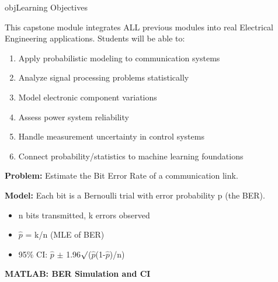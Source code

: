 \begin{PSbox}[unbreakable]{obj}{Learning Objectives}

This capstone module integrates ALL previous modules into real Electrical Engineering applications. Students will be able to:

\begin{enumerate}
\def\labelenumi{\arabic{enumi}.}
\tightlist
\item
  Apply probabilistic modeling to communication systems
\item
  Analyze signal processing problems statistically
\item
  Model electronic component variations
\item
  Assess power system reliability
\item
  Handle measurement uncertainty in control systems
\item
  Connect probability/statistics to machine learning foundations
\end{enumerate}

\end{PSbox}



\textbf{Problem:} Estimate the Bit Error Rate of a communication link.

\textbf{Model:} Each bit is a Bernoulli trial with error probability p (the BER).

\begin{itemize}
\tightlist
\item
  n bits transmitted, k errors observed
\item
  \ensuremath{\hat{p}} = k/n (MLE of BER)
\item
  95\% CI: \ensuremath{\hat{p}} \ensuremath{\pm} 1.96\ensuremath{\surd}(\ensuremath{\hat{p}}(1-\ensuremath{\hat{p}})/n)
\end{itemize}

\textbf{MATLAB: BER Simulation and CI}


